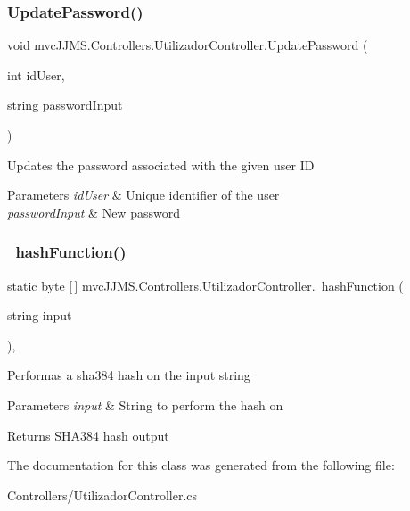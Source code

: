 \subsubsection{\texorpdfstring{Update\+Password()}{UpdatePassword()}}
{\footnotesize\ttfamily void mvc\+J\+J\+M\+S.\+Controllers.\+Utilizador\+Controller.\+Update\+Password (\begin{DoxyParamCaption}\item[{int}]{id\+User,  }\item[{string}]{password\+Input }\end{DoxyParamCaption})\hspace{0.3cm}{\ttfamily [inline]}}



Updates the password associated with the given user ID 


\begin{DoxyParams}{Parameters}
{\em id\+User} & Unique identifier of the user\\
\hline
{\em password\+Input} & New password\\
\hline
\end{DoxyParams}
\mbox{\label{classmvc_j_j_m_s_1_1_controllers_1_1_utilizador_controller_a72e105c651070200f84c3718fdf3c8cc}} 
\subsubsection{\texorpdfstring{ hash\+Function()}{ hashFunction()}}
{\footnotesize\ttfamily static byte \mbox{[}$\,$\mbox{]} mvc\+J\+J\+M\+S.\+Controllers.\+Utilizador\+Controller.\+ hash\+Function (\begin{DoxyParamCaption}\item[{string}]{input }\end{DoxyParamCaption})\hspace{0.3cm}{\ttfamily [inline]}, {\ttfamily [static]}}



Performas a sha384 hash on the input string 


\begin{DoxyParams}{Parameters}
{\em input} & String to perform the hash on\\
\hline
\end{DoxyParams}
\begin{DoxyReturn}{Returns}
S\+H\+A384 hash output
\end{DoxyReturn}


The documentation for this class was generated from the following file\+:\begin{DoxyCompactItemize}
\item 
Controllers/Utilizador\+Controller.\+cs\end{DoxyCompactItemize}

